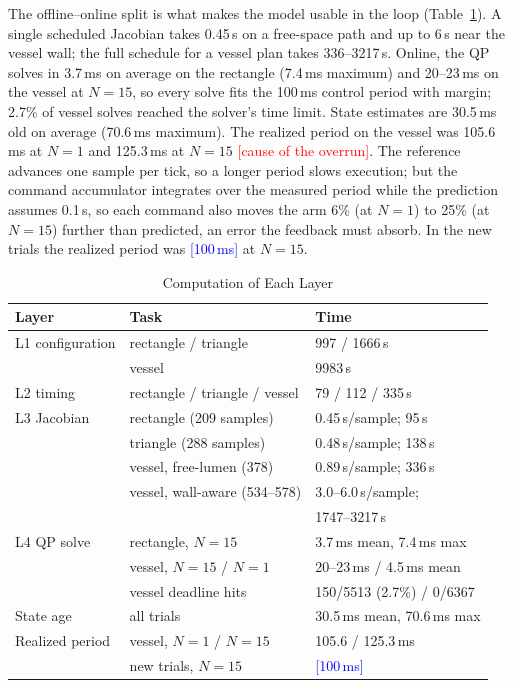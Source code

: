 \documentclass[journal]{IEEEtran}
\newcommand{\TBD}[1]{\textcolor{red}{[#1]}}
\newcommand{\NEWRUN}[1]{\textcolor{blue}{[#1]}}
\begin{document}
The offline--online split is what makes the model usable in the loop
(Table~\ref{tab:compute}). A single scheduled Jacobian takes 0.45\,s on a
free-space path and up to 6\,s near the vessel wall; the full schedule for
a vessel plan takes 336--3217\,s. Online, the QP solves in 3.7\,ms on
average on the rectangle (7.4\,ms maximum) and 20--23\,ms on the vessel at
$N=15$, so every solve fits the 100\,ms control period with margin; 2.7\%
of vessel solves reached the solver's time limit. State estimates are
30.5\,ms old on average (70.6\,ms maximum). The realized period on the
vessel was 105.6\,ms at $N=1$ and 125.3\,ms at $N=15$
\TBD{cause of the overrun}. The reference advances one sample per tick,
so a longer period slows execution; but the command accumulator integrates
over the measured period while the prediction assumes 0.1\,s, so each
command also moves the arm 6\% (at $N=1$) to 25\% (at $N=15$) further
than predicted, an error the feedback must absorb. In the new trials the
realized period was \NEWRUN{100\,ms} at $N=15$.

\begin{table}[t]
\centering
\caption{Computation of Each Layer}
\label{tab:compute}
\footnotesize
\setlength{\tabcolsep}{3pt}
\begin{tabular}{@{}lll@{}}
\toprule
Layer & Task & Time \\
\midrule
L1 configuration & rectangle / triangle & 997 / 1666\,s \\
                 & vessel & 9983\,s \\
L2 timing & rectangle / triangle / vessel & 79 / 112 / 335\,s \\
L3 Jacobian & rectangle (209 samples) & 0.45\,s/sample; 95\,s \\
            & triangle (288 samples)  & 0.48\,s/sample; 138\,s \\
            & vessel, free-lumen (378) & 0.89\,s/sample; 336\,s \\
            & vessel, wall-aware (534--578) & 3.0--6.0\,s/sample; \\
            &                              & 1747--3217\,s \\
\midrule
L4 QP solve & rectangle, $N=15$ & 3.7\,ms mean, 7.4\,ms max \\
            & vessel, $N=15$ / $N=1$ & 20--23\,ms / 4.5\,ms mean \\
            & vessel deadline hits & 150/5513 (2.7\%) / 0/6367 \\
State age & all trials & 30.5\,ms mean, 70.6\,ms max \\
Realized period & vessel, $N=1$ / $N=15$ & 105.6 / 125.3\,ms \\
                & new trials, $N=15$ & \NEWRUN{100\,ms} \\
\bottomrule
\end{tabular}
\end{table}
\end{document}
